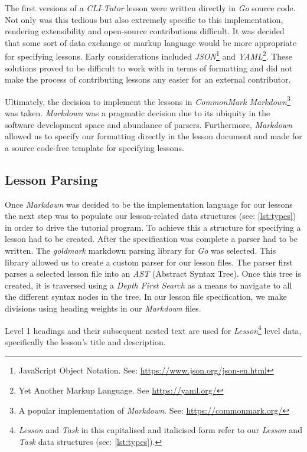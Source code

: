 The first versions of a \textit{CLI-Tutor} lesson were written directly in
\textit{Go} source code. Not only was this tedious but also extremely specific
to this implementation, rendering extensibility and open-source contributions
difficult. It was decided that some sort of data exchange or markup language
would be more appropriate for specifying lessons. Early considerations included
\textit{JSON}\footnote{JavaScript Object Notation. See:
\url{https://www.json.org/json-en.html}} and \textit{YAML}\footnote{Yet Another
Markup Language. See \url{https://yaml.org/}}. These solutions proved to be
difficult to work with in terms of formatting and did not make the process of
contributing lessons any easier for an external contributor.

Ultimately, the decision to implement the lessons in \textit{CommonMark
Markdown}\footnote{A popular implementation of \textit{Markdown}. See:
\url{https://commonmark.org/}} was taken. \textit{Markdown} was a pragmatic
decision due to its ubiquity in the software development space and abundance of
parsers. Furthermore, \textit{Markdown} allowed us to specify our formatting
directly in the lesson document and made for a source code-free template for
specifying lessons.

\subsection{Lesson Parsing}
\label{sec:parser}

Once \textit{Markdown} was decided to be the implementation language for our
lessons the next step was to populate our lesson-related data structures (see:
\autoref{lst:types}) in order to drive the tutorial program. To achieve this a
structure for specifying a lesson had to be created. After the specification
was complete a parser had to be written. The \textit{goldmark} markdown parsing
library for \textit{Go} was selected. This library allowed us to create a
custom parser for our lesson files. The parser first parses a selected lesson
file into an \textit{AST} (Abstract Syntax Tree). Once this tree is created, it
is traversed using a \textit{Depth First Search} as a means to navigate to all
the different syntax nodes in the tree. In our lesson file specification, we
make divisions using heading weights in our \textit{Markdown} files. 

Level 1 headings and their subsequent nested text are used for
\textit{Lesson}\footnote{\textit{Lesson} and \textit{Task} in this
capitalised and italicised form refer to our \textit{Lesson} and \textit{Task}
data structures (see: \autoref{lst:types}).} level data, specifically the
lesson's title and description. 

